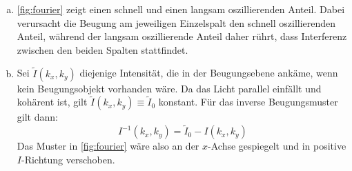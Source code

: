 \begin{enumerate}[(a)]
\item \vref{fig:fourier} zeigt einen schnell und einen langsam oszillierenden Anteil. Dabei verursacht die Beugung am jeweiligen Einzelspalt den schnell oszillierenden Anteil, während der langsam oszillierende Anteil daher rührt, dass Interferenz zwischen den beiden Spalten stattfindet.

\item Sei $\tilde{I}(k_x,k_y)$ diejenige Intensität, die in der Beugungsebene ankäme, wenn kein Beugungsobjekt vorhanden wäre. Da das Licht parallel einfällt und kohärent ist, gilt $\tilde{I}(k_x,k_y) \equiv \tilde{I}_0$ konstant. Für das inverse Beugungsmuster gilt dann:
\begin{equation}
I^{-1} (k_x,k_y) = \tilde{I}_0 - I (k_x,k_y)
\end{equation}
Das Muster in \vref{fig:fourier} wäre also an der $x$-Achse gespiegelt und in positive $I$-Richtung verschoben.

\end{enumerate}